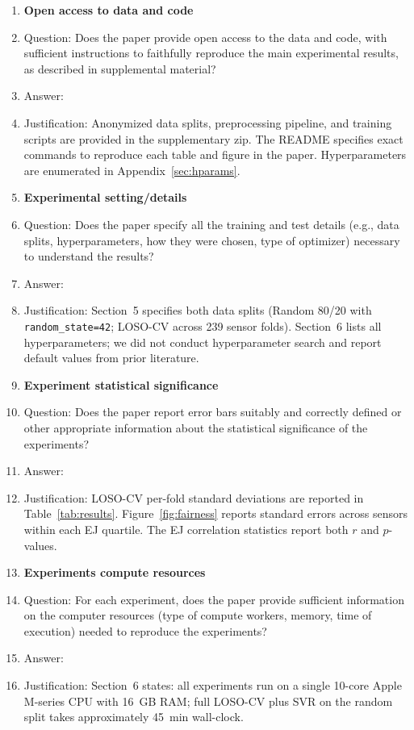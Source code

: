 \begin{enumerate}
\item {\bf Open access to data and code}
    \item[] Question: Does the paper provide open access to the data and code, with sufficient instructions to faithfully reproduce the main experimental results, as described in supplemental material?
    \item[] Answer: \answerYes{}
    \item[] Justification: Anonymized data splits, preprocessing pipeline, and training scripts are provided in the supplementary zip. The README specifies exact commands to reproduce each table and figure in the paper. Hyperparameters are enumerated in Appendix~\ref{sec:hparams}.

\item {\bf Experimental setting/details}
    \item[] Question: Does the paper specify all the training and test details (e.g., data splits, hyperparameters, how they were chosen, type of optimizer) necessary to understand the results?
    \item[] Answer: \answerYes{}
    \item[] Justification: Section~5 specifies both data splits (Random 80/20 with \texttt{random\_state=42}; LOSO-CV across 239 sensor folds). Section~6 lists all hyperparameters; we did not conduct hyperparameter search and report default values from prior literature.

\item {\bf Experiment statistical significance}
    \item[] Question: Does the paper report error bars suitably and correctly defined or other appropriate information about the statistical significance of the experiments?
    \item[] Answer: \answerYes{}
    \item[] Justification: LOSO-CV per-fold standard deviations are reported in Table~\ref{tab:results}. Figure~\ref{fig:fairness} reports standard errors across sensors within each EJ quartile. The EJ correlation statistics report both $r$ and $p$-values.

\item {\bf Experiments compute resources}
    \item[] Question: For each experiment, does the paper provide sufficient information on the computer resources (type of compute workers, memory, time of execution) needed to reproduce the experiments?
    \item[] Answer: \answerYes{}
    \item[] Justification: Section~6 states: all experiments run on a single 10-core Apple M-series CPU with 16~GB RAM; full LOSO-CV plus SVR on the random split takes approximately 45~min wall-clock.


\end{enumerate}
